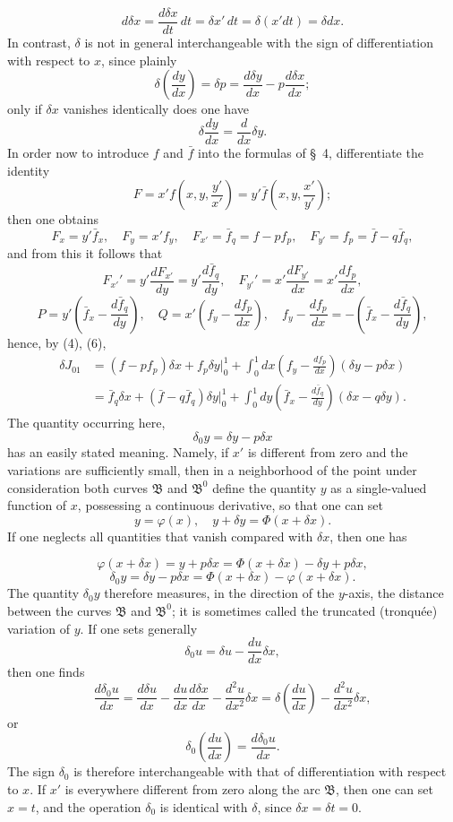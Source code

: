 \documentclass[11pt,a4paper,leqno]{article}
\begin{document}
\[
d\delta x=\frac{d\delta x}{dt}\,dt=\delta x'\,dt=\delta(x'dt)=\delta dx.
\]
In contrast, \(\delta\) is not in general interchangeable with the sign of differentiation with respect to \(x\), since plainly
\[
\delta\left(\frac{dy}{dx}\right)=\delta p=\frac{d\delta y}{dx}-p\frac{d\delta x}{dx};
\]
only if \(\delta x\) vanishes identically does one have
\[
\delta\frac{dy}{dx}=\frac{d}{dx}\delta y.
\]
In order now to introduce \(f\) and \(\bar f\) into the formulas of \S~4, differentiate the identity
\[
F=x'f\left(x,y,\frac{y'}{x'}\right)=y'\bar f\left(x,y,\frac{x'}{y'}\right);
\]
then one obtains
\[
F_x=y'\bar f_x,\quad F_y=x'f_y,\quad F_{x'}=\bar f_q=f-pf_p,\quad F_{y'}=f_p=\bar f-q\bar f_q,
\]
and from this it follows that
\[
F_{x'}'=y'\frac{dF_{x'}}{dy}=y'\frac{d\bar f_q}{dy},\quad
F_{y'}'=x'\frac{dF_{y'}}{dx}=x'\frac{df_p}{dx},
\]
\[
P=y'\left(\bar f_x-\frac{d\bar f_q}{dy}\right),\quad
Q=x'\left(f_y-\frac{df_p}{dx}\right),\quad
f_y-\frac{df_p}{dx}=-\left(\bar f_x-\frac{d\bar f_q}{dy}\right),
\]
hence, by (4), (6),
\[
\begin{aligned}
\delta J_{01}&=(f-pf_p)\delta x+f_p\delta y\bigg|_0^1+\int_0^1dx\left(f_y-\frac{df_p}{dx}\right)(\delta y-p\delta x)\\
&=\bar f_q\delta x+(\bar f-q\bar f_q)\delta y\bigg|_0^1+\int_0^1dy\left(\bar f_x-\frac{d\bar f_q}{dy}\right)(\delta x-q\delta y).
\end{aligned}
\]
The quantity occurring here,
\[
\delta_0y=\delta y-p\delta x
\]
has an easily stated meaning. Namely, if \(x'\) is different from zero and the variations are sufficiently small, then in a neighborhood of the point under consideration both curves \(\mathfrak B\) and \(\mathfrak B^0\) define the quantity \(y\) as a single-valued function of \(x\), possessing a continuous derivative, so that one can set
\[
y=\varphi(x),\quad y+\delta y=\Phi(x+\delta x).
\]
If one neglects all quantities that vanish compared with \(\delta x\), then one has

\[
\varphi(x+\delta x)=y+p\delta x=\Phi(x+\delta x)-\delta y+p\delta x,
\]
\[
\delta_0y=\delta y-p\delta x=\Phi(x+\delta x)-\varphi(x+\delta x).
\]
The quantity \(\delta_0y\) therefore measures, in the direction of the \(y\)-axis, the distance between the curves \(\mathfrak B\) and \(\mathfrak B^0\); it is sometimes called the truncated (tronquée) variation of \(y\). If one sets generally
\[
\delta_0u=\delta u-\frac{du}{dx}\delta x,
\]
then one finds
\[
\frac{d\delta_0u}{dx}=\frac{d\delta u}{dx}-\frac{du}{dx}\frac{d\delta x}{dx}-\frac{d^2u}{dx^2}\delta x
=\delta\left(\frac{du}{dx}\right)-\frac{d^2u}{dx^2}\delta x,
\]
or
\[
\delta_0\left(\frac{du}{dx}\right)=\frac{d\delta_0u}{dx}.
\]
The sign \(\delta_0\) is therefore interchangeable with that of differentiation with respect to \(x\). If \(x'\) is everywhere different from zero along the arc \(\mathfrak B\), then one can set \(x=t\), and the operation \(\delta_0\) is identical with \(\delta\), since \(\delta x=\delta t=0\).
\end{document}
